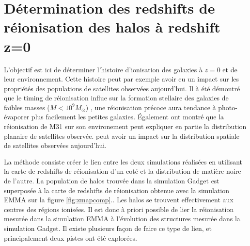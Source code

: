 \section{Détermination des redshifts de réionisation des halos à redshift z=0}

L'objectif est ici de déterminer l'histoire d'ionisation des galaxies à $z=0$ et de leur environnement.
Cette histoire peut par exemple avoir eu un impact sur les propriétés des populations de satellites observées aujourd'hui.
Il à été démontré que le timing de réionisation influe sur la formation stellaire des galaxies de faibles masses ($M<10^9M_\odot$) \citep{ocvirk_reionization_2014}, une réionisation précoce aura tendance à photo-évaporer plus facilement les petites galaxies.
Également \citep{2015ApJ...800...34G} ont montré que la réionisation de M31 sur son environement peut expliquer en partie la distribution planaire de satellites observée.
peut avoir un impact sur la distribution spatiale de satellites observées aujourd'hui.


La méthode consiste créer le lien entre les deux simulations réalisées en utilisant la carte de redshifts de réionisation d'un coté et la distribution de matière noire de l'autre.
La population de halos trouvée dans la simulation Gadget est superposée à la carte de redshifts de réionisation obtenue avec la simulation EMMA sur la figure \ref{fig:zmapcomp}..
Les halos se trouvent effectivement aux centres des régions ionisées.
Il est donc à priori possible de lier la réionisation mesurée dans la simulation EMMA à l'évolution des structures mesurée dans la simulation Gadget.
Il existe plusieurs façon de faire ce type de lien, et principalement deux pistes ont été explorées.


